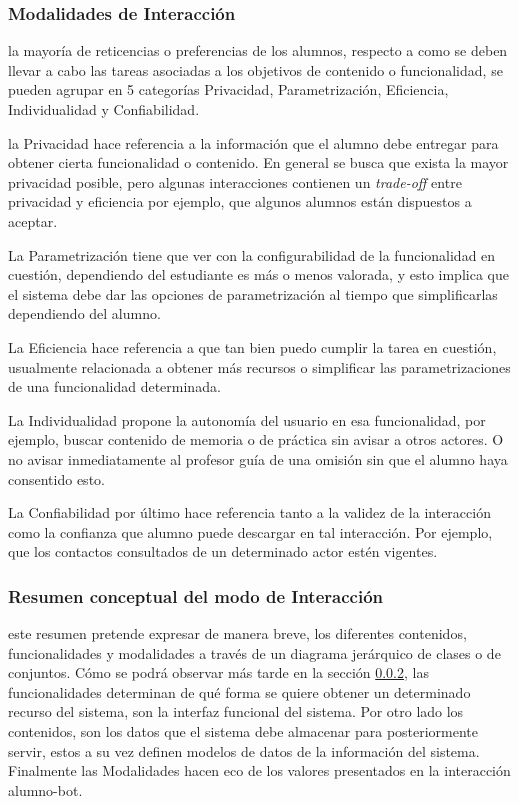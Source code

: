     \subsubsection{Modalidades de Interacción}
    \label{sssec:cualidades}
    \par la mayoría de reticencias o preferencias de los alumnos, respecto a como se deben llevar a cabo las tareas asociadas a los objetivos de contenido o funcionalidad, se pueden agrupar en 5 categorías Privacidad, Parametrización, Eficiencia, Individualidad y Confiabilidad.
    \par la Privacidad hace referencia a la información que el alumno debe entregar para obtener cierta funcionalidad o contenido. En general se busca que exista la mayor privacidad posible, pero algunas interacciones contienen un \textit{trade-off} entre privacidad y eficiencia por ejemplo, que algunos alumnos están dispuestos a aceptar.
    \par La Parametrización tiene que ver con la configurabilidad de la funcionalidad en cuestión, dependiendo del estudiante es más o menos valorada, y esto implica que el sistema debe dar las opciones de parametrización al tiempo que simplificarlas dependiendo del alumno.
    \par La Eficiencia hace referencia a que tan bien puedo cumplir la tarea en cuestión, usualmente relacionada a obtener más recursos o simplificar las parametrizaciones de una funcionalidad determinada.
    \par La Individualidad propone la autonomía del usuario en esa funcionalidad, por ejemplo, buscar contenido de memoria o de práctica sin avisar a otros actores. O no avisar inmediatamente al profesor guía de una omisión sin que el alumno haya consentido esto.
    \par La Confiabilidad por último hace referencia tanto a la validez de la interacción como la confianza que alumno puede descargar en tal interacción. Por ejemplo, que los contactos consultados de un determinado actor estén vigentes.
    
    \subsubsection{Resumen conceptual del modo de Interacción}

    \par este resumen pretende expresar de manera breve, los diferentes contenidos, funcionalidades y modalidades a través de un diagrama jerárquico de clases o de conjuntos. Cómo se podrá observar más tarde en la sección \ref{}, las funcionalidades determinan de qué forma se quiere obtener un determinado recurso del sistema, son la interfaz funcional del sistema. Por otro lado los contenidos, son los datos que el sistema debe almacenar para posteriormente servir, estos a su vez definen modelos de datos de la información del sistema. Finalmente las Modalidades hacen eco de los valores presentados en la interacción alumno-bot.
    
